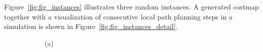 Figure~\ref{fig:fig_instances} illustrates three random instances. 
A generated costmap together with a visualization of consecutive local path planning steps in a simulation is shown in Figure~\ref{fig:fig_instances_detail}.

\begin{figure}[thpb]
     \footnotesize
      \centering
      
      \setlength\fboxsep{0pt}
      \setlength\fboxrule{0.5pt}
      \captionsetup[subfigure]{labelformat=empty}   
      \begin{subfigure}[thpb]{0.23\textwidth}    
        \caption{(a)}
        \label{fig_instances_1}
      \end{subfigure}
      \begin{subfigure}[thpb]{0.23\textwidth}    

\end{subfigure}
\end{figure}
